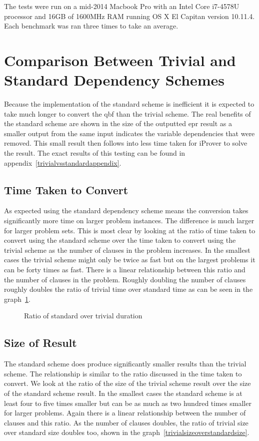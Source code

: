 The tests were run on a mid-2014 Macbook Pro with an Intel Core i7-4578U processor and 16GB of 1600MHz RAM running OS X El Capitan version 10.11.4. Each benchmark was ran three times to take an average.

\section{Comparison Between Trivial and Standard Dependency Schemes} \label{trivialvsstd}
Because the implementation of the standard scheme is inefficient it is expected to take much longer to convert the \gls{qbf} than the trivial scheme. The real benefits of the standard scheme are shown in the size of the outputted \gls{epr} result as a smaller output from the same input indicates the variable dependencies that were removed. This small result then follows into less time taken for iProver to solve the result. The exact results of this testing can be found in appendix~\ref{trivialvsstandardappendix}.

\subsection{Time Taken to Convert}
As expected using the standard dependency scheme means the conversion takes significantly more time on larger problem instances. The difference is much larger for larger problem sets. This is most clear by looking at the ratio of time taken to convert using the standard scheme over the time taken to convert using the trivial scheme as the number of clauses in the problem increases. In the smallest cases the trivial scheme might only be twice as fast but on the largest problems it can be forty times as fast. There is a linear relationship between this ratio and the number of clauses in the problem. Roughly doubling the number of clauses roughly doubles the ratio of trivial time over standard time as can be seen in the graph~\ref{standarddurationovertrivialduration}.

\begin{figure}[h]
\caption{Ratio of standard over trivial duration}
\label{standarddurationovertrivialduration}
\begin{CenteredBox}

\end{CenteredBox}
\end{figure}

\subsection{Size of Result}
The standard scheme does produce significantly smaller results than the trivial scheme. The relationship is similar to the ratio discussed in the time taken to convert. We look at the ratio of the size of the trivial scheme result over the size of the standard scheme result. In the smallest cases the standard scheme is at least four to five times smaller but can be as much as two hundred times smaller for larger problems. Again there is a linear relationship between the number of clauses and this ratio. As the number of clauses doubles, the ratio of trivial size over standard size doubles too, shown in the graph~\ref{trivialsizeoverstandardsize}.

